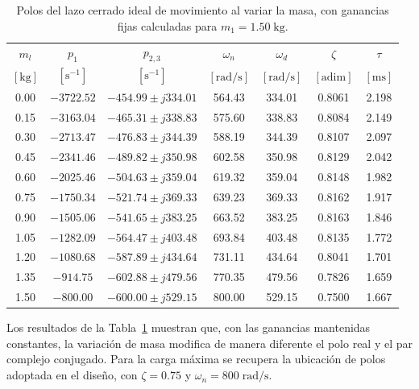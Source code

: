 \documentclass[blue,fullpaper]{ludusofficial}  %
\begin{document}
\begin{table}[!htbp]

\centering

\small

\caption{Polos del lazo cerrado ideal de movimiento al variar la masa, con ganancias fijas calculadas para $m_1=1.50\;\mathrm{kg}$.}

\label{tab:polos-barrido-masa}

\begin{tabular}{c c c c c c c}
\hline
$m_l$ & $p_1$ & $p_{2,3}$ & $\omega_n$ & $\omega_d$ & $\zeta$ & $\tau$ \\

$[\mathrm{kg} ]$ & $[\mathrm{s^{-1}}]$ & $[\mathrm{s^{-1}}]$ & $[\mathrm{rad/s}]$ & $[\mathrm{rad/s}]$ & $[\mathrm{adim}]$ & $[\mathrm{ms}]$ \\

\hline

0.00 & $-3722.52$ & $-454.99 \pm j334.01$ & 564.43 & 334.01 & 0.8061 & 2.198 \\
0.15 & $-3163.04$ & $-465.31 \pm j338.83$ & 575.60 & 338.83 & 0.8084 & 2.149 \\
0.30 & $-2713.47$ & $-476.83 \pm j344.39$ & 588.19 & 344.39 & 0.8107 & 2.097 \\
0.45 & $-2341.46$ & $-489.82 \pm j350.98$ & 602.58 & 350.98 & 0.8129 & 2.042 \\
0.60 & $-2025.46$ & $-504.63 \pm j359.04$ & 619.32 & 359.04 & 0.8148 & 1.982 \\
0.75 & $-1750.34$ & $-521.74 \pm j369.33$ & 639.23 & 369.33 & 0.8162 & 1.917 \\
0.90 & $-1505.06$ & $-541.65 \pm j383.25$ & 663.52 & 383.25 & 0.8163 & 1.846 \\
1.05 & $-1282.09$ & $-564.47 \pm j403.48$ & 693.84 & 403.48 & 0.8135 & 1.772 \\
1.20 & $-1080.68$ & $-587.89 \pm j434.64$ & 731.11 & 434.64 & 0.8041 & 1.701 \\
1.35 & $-914.75$ & $-602.88 \pm j479.56$ & 770.35 & 479.56 & 0.7826 & 1.659 \\
1.50 & $-800.00$ & $-600.00 \pm j529.15$ & 800.00 & 529.15 & 0.7500 & 1.667 \\

\hline
\end{tabular}
\end{table}

Los resultados de la Tabla~\ref{tab:polos-barrido-masa} muestran
que, con las ganancias mantenidas constantes, la variación de
masa modifica de manera diferente el polo real y el par complejo
conjugado. Para la carga máxima se recupera la ubicación de polos
adoptada en el diseño, con $\zeta=0.75$ y
$\omega_n=800\;\mathrm{rad/s}$.
\end{document}
